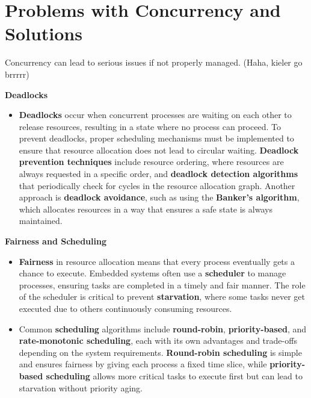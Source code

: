 \documentclass[
  14pt,
  a4paper,
  numbers=noendperiod,
  headinclude=true,
  footinclude=true,
  DIV=calc]{scrreprt}
\providecommand{\tightlist}{%
  \setlength{\itemsep}{0pt}\setlength{\parskip}{0pt}}\usepackage{longtable,booktabs,array}
\begin{document}
\section{Problems with Concurrency and
Solutions}\label{problems-with-concurrency-and-solutions}

Concurrency can lead to serious issues if not properly managed. (Haha,
kieler go brrrrr)

\textbf{Deadlocks}

\begin{itemize}
\tightlist
\item
  \textbf{Deadlocks} occur when concurrent processes are waiting on each
  other to release resources, resulting in a state where no process can
  proceed. To prevent deadlocks, proper scheduling mechanisms must be
  implemented to ensure that resource allocation does not lead to
  circular waiting. \textbf{Deadlock prevention techniques} include
  resource ordering, where resources are always requested in a specific
  order, and \textbf{deadlock detection algorithms} that periodically
  check for cycles in the resource allocation graph. Another approach is
  \textbf{deadlock avoidance}, such as using the \textbf{Banker's
  algorithm}, which allocates resources in a way that ensures a safe
  state is always maintained.
\end{itemize}

\textbf{Fairness and Scheduling}

\begin{itemize}
\item
  \textbf{Fairness} in resource allocation means that every process
  eventually gets a chance to execute. Embedded systems often use a
  \textbf{scheduler} to manage processes, ensuring tasks are completed
  in a timely and fair manner. The role of the scheduler is critical to
  prevent \textbf{starvation}, where some tasks never get executed due
  to others continuously consuming resources.
\item
  Common \textbf{scheduling} algorithms include \textbf{round-robin},
  \textbf{priority-based}, and \textbf{rate-monotonic scheduling}, each
  with its own advantages and trade-offs depending on the system
  requirements. \textbf{Round-robin scheduling} is simple and ensures
  fairness by giving each process a fixed time slice, while
  \textbf{priority-based scheduling} allows more critical tasks to
  execute first but can lead to starvation without priority aging.
\end{itemize}
\end{document}

